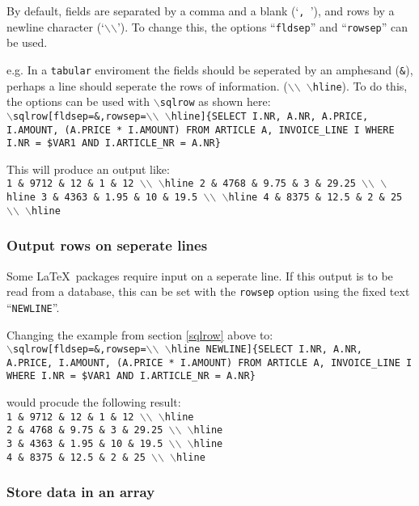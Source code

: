 \documentclass{article}
\newcommand{\bs}{\ensuremath{\backslash}}
\newcommand{\vs}{\vspace{3mm}}
\begin{document}
\vs

By default, fields are separated by a comma and a blank (`\texttt{,~}'), and rows by 
a newline character (`\texttt{\bs\bs}'). To change this, the options ``\texttt{fldsep}''
and ``\texttt{rowsep}'' can be used.

e.g. In a \texttt{tabular} enviroment the fields should be seperated by an amphesand (\texttt{\&}),
perhaps a line should seperate the rows of information. (\texttt{\bs\bs~\bs hline}).
To do this, the options can be used with \texttt{\bs sqlrow} as shown here: \\
\texttt{\bs sqlrow[fldsep=\&,rowsep=\bs\bs~\bs hline]\{SELECT I.NR, A.NR, 
A.PRICE, I.AMOUNT, (A.PRICE * I.AMOUNT) FROM ARTICLE A, INVOICE\_LINE I WHERE I.NR = \$VAR1 
AND I.ARTICLE\_NR = A.NR\}}

\vs

This will produce an output like: \\
\texttt{1 \& 9712 \& 12 \& 1 \& 12 \bs\bs~\bs hline 
2 \& 4768 \& 9.75 \& 3 \& 29.25 \bs\bs~\bs hline 
3 \& 4363 \& 1.95 \& 10 \& 19.5 \bs\bs~\bs hline 
4 \& 8375 \& 12.5 \& 2 \& 25 \bs\bs~\bs hline}

\subsubsection{Output rows on seperate lines}

Some \LaTeX\ packages require input on a seperate line. If this output is to be
read from a database, this can be set with the \texttt{rowsep} option using the
fixed text ``\texttt{NEWLINE}''.

Changing the example from section \ref{sqlrow} above to:\\
\texttt{\bs sqlrow[fldsep=\&,rowsep=\bs\bs~\bs hline NEWLINE]\{SELECT I.NR, A.NR, 
A.PRICE, I.AMOUNT, (A.PRICE * I.AMOUNT) FROM ARTICLE A, INVOICE\_LINE I WHERE I.NR = \$VAR1 
AND I.ARTICLE\_NR = A.NR\}}

\vs

would procude the following result: \\
\texttt{1 \& 9712 \& 12 \& 1 \& 12 \bs\bs~\bs hline \\
2 \& 4768 \& 9.75 \& 3 \& 29.25 \bs\bs~\bs hline \\
3 \& 4363 \& 1.95 \& 10 \& 19.5 \bs\bs~\bs hline \\
4 \& 8375 \& 12.5 \& 2 \& 25 \bs\bs~\bs hline}



\subsubsection{Store data in an array}
\end{document}
